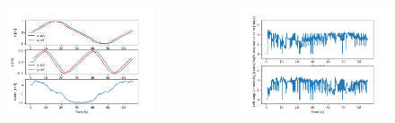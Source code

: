 \documentclass{beamer}
\begin{document}
\begin{frame}[allowframebreaks]
\begin{columns}
\vspace{-1em}

\begin{figure}[H]
    \centering
    \includegraphics[scale=0.3]{img/dwa_screenshots/Pose.png}
\end{figure}


\vspace{-2em}

\begin{figure}[H]
    \centering
    \includegraphics[scale=0.3]{img/dwa_screenshots/Wheels_Velocities.png}
\end{figure}

\vspace{-1em}


\end{columns}
\end{frame}
\end{document}
